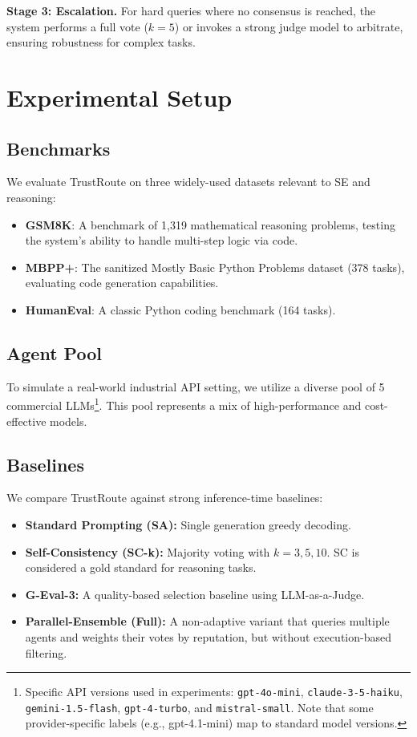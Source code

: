 \documentclass[acmsmall,screen,review,anonymous]{acmart}
\begin{document}
\textbf{Stage 3: Escalation.} For hard queries where no consensus is reached, the system performs a full vote ($k=5$) or invokes a strong judge model to arbitrate, ensuring robustness for complex tasks.

\section{Experimental Setup}

\subsection{Benchmarks}
We evaluate TrustRoute on three widely-used datasets relevant to SE and reasoning:
\begin{itemize}
    \item \textbf{GSM8K}: A benchmark of 1,319 mathematical reasoning problems, testing the system's ability to handle multi-step logic via code.
    \item \textbf{MBPP+}: The sanitized Mostly Basic Python Problems dataset (378 tasks), evaluating code generation capabilities.
    \item \textbf{HumanEval}: A classic Python coding benchmark (164 tasks).
\end{itemize}

\subsection{Agent Pool}
To simulate a real-world industrial API setting, we utilize a diverse pool of 5 commercial LLMs\footnote{Specific API versions used in experiments: \texttt{gpt-4o-mini}, \texttt{claude-3-5-haiku}, \texttt{gemini-1.5-flash}, \texttt{gpt-4-turbo}, and \texttt{mistral-small}. Note that some provider-specific labels (e.g., gpt-4.1-mini) map to standard model versions.}. This pool represents a mix of high-performance and cost-effective models.

\subsection{Baselines}
We compare TrustRoute against strong inference-time baselines:
\begin{itemize}
    \item \textbf{Standard Prompting (SA):} Single generation greedy decoding.
    \item \textbf{Self-Consistency (SC-k):} Majority voting with $k=3, 5, 10$. SC is considered a gold standard for reasoning tasks.
    \item \textbf{G-Eval-3:} A quality-based selection baseline using LLM-as-a-Judge.
    \item \textbf{Parallel-Ensemble (Full):} A non-adaptive variant that queries multiple agents and weights their votes by reputation, but without execution-based filtering.
\end{itemize}
\end{document}
